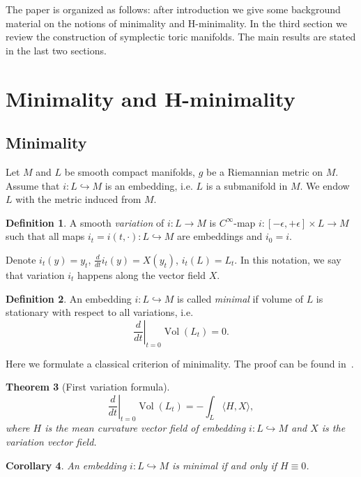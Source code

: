\documentclass[jsg]{IP_v1_forauthors}
\def\Vol{\mathop{\mathrm{Vol}}}
\newtheorem{theo}{Theorem}[section]
\newtheorem{coro}[theo]{Corollary}
\theoremstyle{definition}
\newtheorem{defi}[theo]{Definition}
\newtheorem{rema}[theo]{Remark}
\numberwithin{equation}{section}
\begin{document}
The paper is organized as follows: after introduction we give some background material on the notions of minimality and H-minimality. In the third section we review the construction of symplectic toric manifolds. The main results are stated in the last two sections.

\section{Minimality and H-minimality}

\subsection{Minimality}


Let $M$ and $L$ be smooth compact manifolds, $g$ be a Riemannian metric on $M$. Assume that $i:L \hookrightarrow M$ is an embedding, i.e. $L$ is a submanifold in $M$. We endow $L$ with the metric induced from $M$.

\begin{defi}
A smooth {\itshape variation} of $i \colon L \to M$ is $C^{\infty}$-map $i:[-\epsilon,+\epsilon]\times L \rightarrow M$ such that all maps $i_t = i(t,\cdot):L \hookrightarrow M$ are embeddings and $i_0 =i$.
\end{defi}

Denote $i_t(y)=y_t$, $ \frac d {dt} i_t(y)= X(y_t)$, $i_t(L)=L_t$. In this notation, we say that variation $i_t$ happens along the vector field $X$.
\begin{defi}
An embedding $i: L \hookrightarrow M$ is called {\itshape minimal} if volume of $L$ is stationary with respect to all variations, i.e.
\begin{equation} 
\left. \frac d{dt} \right |_{t=0} \Vol(L_t) = 0.
\end{equation}
\end{defi}

Here we formulate a classical criterion of minimality. The proof can be found in~\cite[Theorem~4]{L}.
\begin{theo}[First variation formula]
\begin{equation}
\left. \frac d{dt} \right |_{t=0} \Vol(L_t) = - \int_L \langle H, X \rangle, 
\end{equation}
where $H$ is the mean curvature vector field of embedding $i: L \hookrightarrow M$ and $X$ is the variation vector field.
\end{theo}
\begin{coro}
An embedding $i:L \hookrightarrow M$ is minimal if and only if $H \equiv 0$.
\end{coro}
\end{document}
